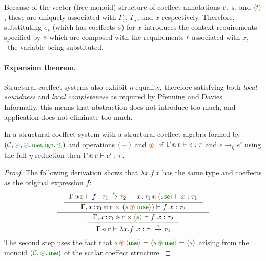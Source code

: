 \noindent
Because of the vector (free monoid) structure of coeffect annotations $\aclrd{\textbf{r}}$,
$\aclrd{\textbf{s}}$, and $\alift{\cclrd{t}}$, these are uniquely associated with $\Gamma_r$,
$\Gamma_s$, and $x$ respectively. Therefore, substituting $e_s$ (which has coeffects
$\aclrd{\textbf{s}}$) for $x$ introduces the context requirements specified by $\aclrd{\textbf{s}}$
which are composed with the requirements $\cclrd{t}$ associated with $x$, \ie~the variable being
substituted.

\paragraph{Expansion theorem.}
Structural coeffect systems also exhibit $\eta$-equality, therefore satisfying both
\emph{local soundness} and \emph{local completeness} as required by Pfenning and Davies
\cite{logic-modal-reconstruction}. Informally, this means that abstraction does not introduce
too much, and application does not eliminate too much.

\begin{theorem}
In a structural coeffect system with a structural coeffect algebra formed by
$(\C, \cseq, \cpar, \cunit, \czero, \cleq)$ and operations $\alift{-}$ and $\aseq$,
if $\coctx{\Gamma}{\aclrd{\textbf{r}}} \vdash e : \tau$
and $e \rightarrow_{\eta} e'$ using the full $\eta$-reduction then
$\coctx{\Gamma}{\aclrd{\textbf{r}}} \vdash e' : \tau$.
\end{theorem}
\begin{proof}
The following derivation shows that $\lambda x.f~x$ has the same type and coeffects as
the original expression $f$:
\begin{equation*}
\inference
  { \inference
    { \coctx{\Gamma}{\aclrd{\textbf{r}}} \vdash f : \tau_1 \xrightarrow{\cclrd{s}} \tau_2 &
      \coctx{x\!:\!\tau_1}{\alift{\cunit}} \vdash x:\tau_1 }
    { \coctx{\Gamma, x\!:\!\tau_1}{\aclrd{\textbf{r}} \;\atimes\;(\cclrd{s}\,\aseq\,\alift{\cunit}) } \vdash f~x : \tau_2 } }
  { \inference
    { \coctx{\Gamma, x\!:\!\tau_1}{\aclrd{\textbf{r}} \;\atimes\,\alift{\cclrd{s}} } \vdash f~x : \tau_2 }
    { \coctx{\Gamma}{ \aclrd{\textbf{r}} } \vdash \lambda x.f~x : \tau_1 \xrightarrow{\cclrd{s}} \tau_2 } }
\end{equation*}
%
The second step uses the fact that
$\cclrd{s} \,\aseq\, \alift{\cunit} = \alift{\cclrd{s} \,\cseq\, \cunit} = \alift{\cclrd{s}}$
arising from the monoid $(\C, \cseq, \cunit)$ of the scalar coeffect structure.
\end{proof}

